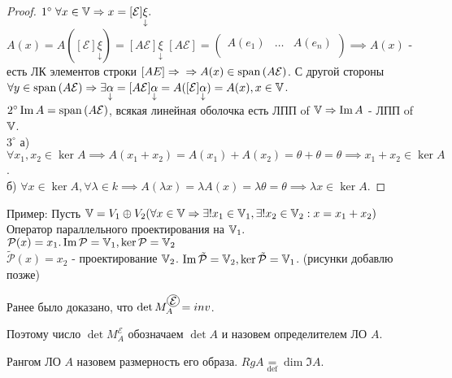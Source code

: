 \documentclass[../main.tex]{subfiles}
\begin{document}
\begin{proof}
    $1^{\circ} \; \forall x \in \mathbb{V} \Rightarrow x = [\mathcal{E}]\underset{\downarrow}{\xi}.$ \\ 
    $A(x)= A([\mathcal{E}]\underset{\downarrow}{\xi}) = [A\mathcal{E}]\underset{\downarrow}{\xi}$  
    $[A\mathcal{E}]= \begin{pmatrix}
        A(e_{1}) & \dots & A(e_{n}) \\
    \end{pmatrix}\implies A(x)$ - есть ЛК элементов строки $[AE]\Rightarrow \\ \Rightarrow A(x)\in \operatorname{span}{(A\mathcal{E})}$. С другой стороны $\forall y \in \operatorname{span}{(A\mathcal{E})}\Rightarrow \exists \underset{\downarrow}{\alpha} = [A\mathcal{E}]\underset{\downarrow}{\alpha}= A([\mathcal{E}]\underset{\downarrow}{\alpha}) = A(x), x \in \mathbb{V}$.
    \\$2^{\circ} \operatorname{Im} A= \operatorname{span}{(A\mathcal{E})}$, всякая линейная оболочка есть ЛПП of $\mathbb{V}\Rightarrow \operatorname{Im} A $ - ЛПП of $\mathbb{V}$. \\ 
    $3^{\circ}$ а) $\forall x_{1},x_{2} \in \ker{A}\implies A(x_{1}+x_{2}) = A(x_{1}) + A(x_{2}) = \theta + \theta = \theta\implies x_{1}+x_{2} \in \ker{A}$. \\ 
    б) $\forall x\in \ker{A}, \forall \lambda \in k \implies A(\lambda x) = \lambda A(x) = \lambda \theta = \theta\implies \lambda x \in \ker{A}$.   

\end{proof}
Пример: Пусть $\mathbb{V} = V_{1} \oplus V_{2} ( \forall x \in \mathbb{V} \Rightarrow \exists ! x_{1} \in \mathbb{V}_{1} , \exists ! x_{2}\in \mathbb{V}_{2}: x = x_{1}+x_{2})$
\\Оператор параллельного проектирования на $\mathbb{V}_{1}.$
$\mathcal{P}(x)=x_{1}. \operatorname{Im}  \mathcal{P}=\mathbb{V}_{1}, \ker{\mathcal{P}}=\mathbb{V}_{2}$
\\$\tilde{\mathcal{P}}(x)=x_{2}$ - проектирование $\mathbb{V}_{2}$. $\operatorname{Im} \tilde{\mathcal{P}}=\mathbb{V}_{2}, \ker{\tilde{\mathcal{P}}}=\mathbb{V}_{1}$. (рисунки добавлю позже)
\vspace{0.5cm}

Ранее было доказано, что $\det{M_{A}^{\tcircle{$\mathcal{E}$}}}=inv$. 
\begin{definition}
Поэтому число $\det{M_{A}^{\mathcal{E}}}$ обозначаем $\det{A}$ и назовем определителем ЛО $A$.
\end{definition}
\begin{definition} 
    Рангом ЛО $A$ назовем размерность его образа. $RgA \underset{\text{def}}{=} \dim{\Im A}$. 
\end{definition}
\end{document}
